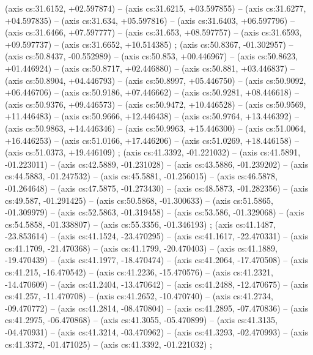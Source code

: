     (axis cs:31.6152,    +02.597874) --  (axis cs:31.6215,    +03.597855) --  (axis cs:31.6277,    +04.597835) --  (axis cs:31.634,    +05.597816) --  (axis cs:31.6403,    +06.597796) --  (axis cs:31.6466,    +07.597777) --  (axis cs:31.653,    +08.597757) --  (axis cs:31.6593,    +09.597737) --  (axis cs:31.6652,    +10.514385) ;
    (axis cs:50.8367,    -01.302957) --  (axis cs:50.8437,    -00.552989) --  (axis cs:50.853,    +00.446967) --  (axis cs:50.8623,    +01.446924) --  (axis cs:50.8717,    +02.446880) --  (axis cs:50.881,    +03.446837) --  (axis cs:50.8904,    +04.446793) --  (axis cs:50.8997,    +05.446750) --  (axis cs:50.9092,    +06.446706) --  (axis cs:50.9186,    +07.446662) --  (axis cs:50.9281,    +08.446618) --  (axis cs:50.9376,    +09.446573) --  (axis cs:50.9472,    +10.446528) --  (axis cs:50.9569,    +11.446483) --  (axis cs:50.9666,    +12.446438) --  (axis cs:50.9764,    +13.446392) --  (axis cs:50.9863,    +14.446346) --  (axis cs:50.9963,    +15.446300) --  (axis cs:51.0064,    +16.446253) --  (axis cs:51.0166,    +17.446206) --  (axis cs:51.0269,    +18.446158) --  (axis cs:51.0373,    +19.446109) ;
    (axis cs:41.3392,    -01.221032) --  (axis cs:41.5891,    -01.223011) --  (axis cs:42.5889,    -01.231028) --  (axis cs:43.5886,    -01.239202) --  (axis cs:44.5883,    -01.247532) --  (axis cs:45.5881,    -01.256015) --  (axis cs:46.5878,    -01.264648) --  (axis cs:47.5875,    -01.273430) --  (axis cs:48.5873,    -01.282356) --  (axis cs:49.587,    -01.291425) --  (axis cs:50.5868,    -01.300633) --  (axis cs:51.5865,    -01.309979) --  (axis cs:52.5863,    -01.319458) --  (axis cs:53.586,    -01.329068) --  (axis cs:54.5858,    -01.338807) --  (axis cs:55.3356,    -01.346193) ;
    (axis cs:41.1487,    -23.853614) --  (axis cs:41.1524,    -23.470295) --  (axis cs:41.1617,    -22.470331) --  (axis cs:41.1709,    -21.470368) --  (axis cs:41.1799,    -20.470403) --  (axis cs:41.1889,    -19.470439) --  (axis cs:41.1977,    -18.470474) --  (axis cs:41.2064,    -17.470508) --  (axis cs:41.215,    -16.470542) --  (axis cs:41.2236,    -15.470576) --  (axis cs:41.2321,    -14.470609) --  (axis cs:41.2404,    -13.470642) --  (axis cs:41.2488,    -12.470675) --  (axis cs:41.257,    -11.470708) --  (axis cs:41.2652,    -10.470740) --  (axis cs:41.2734,    -09.470772) --  (axis cs:41.2814,    -08.470804) --  (axis cs:41.2895,    -07.470836) --  (axis cs:41.2975,    -06.470868) --  (axis cs:41.3055,    -05.470899) --  (axis cs:41.3135,    -04.470931) --  (axis cs:41.3214,    -03.470962) --  (axis cs:41.3293,    -02.470993) --  (axis cs:41.3372,    -01.471025) --  (axis cs:41.3392,    -01.221032) ;

